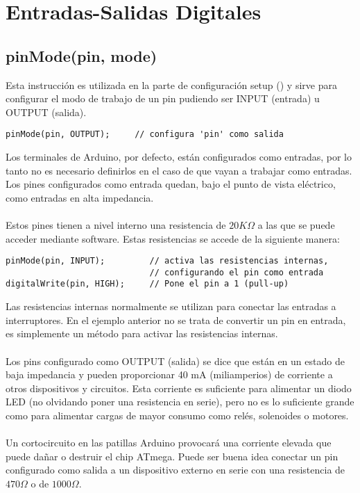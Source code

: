 \chapter{Entradas-Salidas Digitales}
\section{pinMode(pin, mode)}

Esta instrucción es utilizada en la parte de configuración setup () y sirve para configurar el modo de trabajo de un pin pudiendo ser INPUT (entrada) u OUTPUT (salida).
\begin{lstlisting}
pinMode(pin, OUTPUT);     // configura 'pin' como salida
\end{lstlisting}
Los terminales de Arduino, por defecto, están configurados como entradas, por lo tanto no es necesario definirlos en el caso de que vayan a trabajar como entradas. Los pines configurados como entrada quedan, bajo el punto de vista eléctrico, como entradas en alta impedancia.\\\\
Estos pines tienen a nivel interno una resistencia de $20 K \Omega$ a las que se puede acceder mediante software. Estas resistencias se accede de la siguiente manera:
\begin{lstlisting}
pinMode(pin, INPUT);         // activa las resistencias internas,
                             // configurando el pin como entrada
digitalWrite(pin, HIGH);     // Pone el pin a 1 (pull-up)
\end{lstlisting}
Las resistencias internas normalmente se utilizan para conectar las entradas a interruptores. En el ejemplo anterior no se trata de convertir un pin en entrada, es simplemente un método para activar las resistencias internas.\\\\
Los pins configurado como OUTPUT (salida) se dice que están en un estado de baja impedancia y pueden proporcionar 40 mA (miliamperios) de corriente a otros dispositivos y circuitos. Esta corriente es suficiente para alimentar un diodo LED (no olvidando poner una resistencia en serie), pero no es lo suficiente grande como para alimentar cargas de mayor consumo como relés, solenoides o motores.\\\\
Un cortocircuito en las patillas Arduino provocará una corriente elevada que puede dañar o destruir el chip ATmega. Puede ser buena idea conectar un pin configurado como salida a un dispositivo externo en serie con una resistencia de $470 \Omega$ o de $1000 \Omega$.
